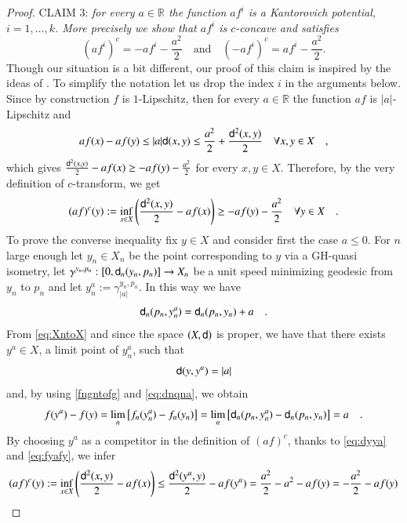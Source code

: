\documentclass[11pt,reqno]{amsart}
\newcommand{\sfd}{{\sf d}}
\newcommand{\R}{\mathbb{R}}
\theoremstyle{definition}
\theoremstyle{remark}
\theoremstyle{remark}
\theoremstyle{remark}
\theoremstyle{remark}
\theoremstyle{remark}
\theoremstyle{remark}
\theoremstyle{remark}
\begin{document}
\begin{proof}
CLAIM 3:\emph{ for every $a\in \R$ the function $af^i$ is a Kantorovich potential, $i=1,\ldots,k$. More precisely we show that $af^i$ is $c$-concave and satisfies }
\begin{equation}\label{eq:afc}
(af^i)^c = -a f^i- \frac{a^2}{2} \quad \text{and} \quad (-af^i)^c=a f^i -\frac{a^2}{2}.
\end{equation}
Though our situation is a bit different, our proof of this claim is inspired by the ideas of \cite{GigliSplitting}.  To simplify the notation let us drop the index $i$ in the arguments below. Since by construction  $f$ is $1$-Lipschitz, then for every $a \in \R$ the function $af$ is $|a|$-Lipschitz and 
$$a f(x)- a f(y) \leq |a| \sfd (x,y) \leq \frac{a^2}{2}+\frac{\sfd^2(x,y)}{2} \quad \forall x,y \in X \quad, $$
which gives $\frac{\sfd^2(x,y)}{2}-a f(x) \geq - a f(y)-\frac{a^2}{2}$ for every $x,y \in X$. Therefore, by the very definition of $c$-transform, we get
\begin{equation}\label{eq:afc>}
(af)^c(y):=\inf_{x\in X} \left(\frac{\sfd^2(x,y)}{2}-a f(x)\right) \geq - a f(y)-\frac{a^2}{2} \quad \forall y \in X \quad.
\end{equation}
To prove the converse inequality fix $y \in X$ and consider first the case $a\leq0$. For $n$ large enough let $y_n\in X_n$ be the point corresponding to $y$ via a GH-quasi isometry,  let $\gamma^{y_n,p_n}:[0, \sfd_n(y_n,p_n)]\to X_n$ be a unit speed minimizing geodesic from $y_n$ to $p_n$ and let $y^a_n:=\gamma^{y_n,p_n}_{|a|}$. In this way we have
\begin{equation}\label{eq:dnqna}
\sfd_n(p_n,y^a_n)=\sfd_n(p_n,y_n)+a \quad.
\end{equation}
From \eqref{eq:XntoX} and  since the space $(X,\sfd)$ is proper, we have that there exists  $y^a\in X$, a limit point of  $y^a_n$, such that 
\begin{equation}\label{eq:dyya}
\sfd(y,y^a)=|a|
\end{equation}
and, by using \eqref{fngntofg} and \eqref{eq:dnqna}, we  obtain 
\begin{equation} \label{eq:fyafy}
f(y^a)-f(y)= \lim_{n} \left[ f_n(y^a_n)-f_n(y_n) \right] =  \lim_{n} \left[ \sfd_n(p_n,y^a_n)-\sfd_n(p_n,y_n) \right] =a   \quad.
\end{equation}
By choosing $y^a$ as a competitor in the definition of $(af)^c$, thanks to  \eqref{eq:dyya} and  \eqref{eq:fyafy}, we infer
\begin{equation}\label{eq:afcpf}
(af)^c(y):= \inf_{x\in X} \left(\frac{\sfd^2(x,y)}{2}-a f(x)\right) \leq \frac{\sfd^2(y^a,y)}{2}-a f(y^a)=\frac{a^2}{2}- a^2- a f(y) = -\frac{a^2}{2}-a f(y) 

\end{equation}
\end{proof}
\end{document}
